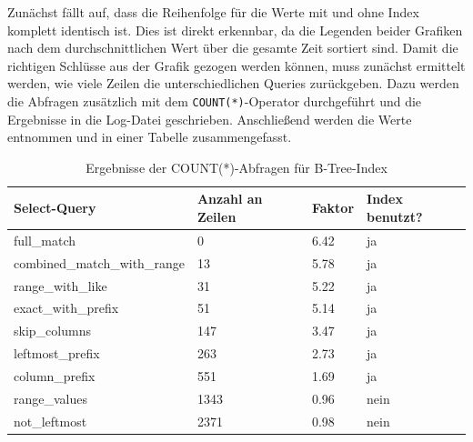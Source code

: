 Zunächst fällt auf, dass die Reihenfolge für die Werte mit und ohne Index komplett identisch ist.
Dies ist direkt erkennbar, da die Legenden beider Grafiken nach dem durchschnittlichen Wert über die gesamte Zeit sortiert sind.
Damit die richtigen Schlüsse aus der Grafik gezogen werden können, muss zunächst ermittelt werden, wie viele Zeilen die unterschiedlichen Queries zurückgeben.
Dazu werden die Abfragen zusätzlich mit dem \texttt{COUNT(*)}-Operator durchgeführt und die Ergebnisse in die Log-Datei geschrieben.
Anschließend werden die Werte entnommen und in einer Tabelle zusammengefasst.

\vspace{-5pt}
\begin{table}[H]
    \centering
    \scriptsize
    \begin{tabular}{|l|l|l|l|}
        \hline
        \textbf{Select-Query} & \textbf{Anzahl an Zeilen} & \textbf{Faktor} & \textbf{Index benutzt?} \\
        \hline
        full\_match & 0 & 6.42 & ja \\
        combined\_match\_with\_range & 13 & 5.78 & ja \\
        range\_with\_like & 31 & 5.22 & ja \\
        exact\_with\_prefix & 51 & 5.14 & ja \\
        skip\_columns & 147 & 3.47 & ja \\
        leftmost\_prefix & 263 & 2.73 & ja \\
        column\_prefix & 551 & 1.69 & ja \\
        range\_values & 1343 & 0.96 & nein \\
        not\_leftmost & 2371 & 0.98 & nein \\
        \hline
    \end{tabular}
    \vspace{3pt}
    \caption{Ergebnisse der COUNT(*)-Abfragen für B-Tree-Index}
    \label{tab:indexing_b_tree_count_results}
\end{table}
\vspace{-25pt}

